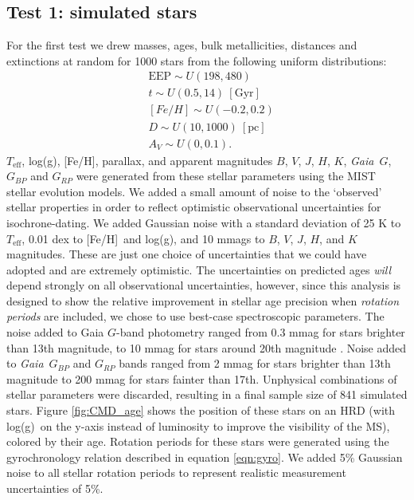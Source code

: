 \documentclass[useAMS, usenatbib, preprint, 12pt]{aastex}
\newcommand{\gaia}{{\it Gaia}}
\newcommand{\teff}{$T_{\mathrm{eff}}$}
\newcommand{\feh}{[Fe/H]}
\newcommand{\logg}{log(g)}
\begin{document}
\subsection{Test 1: simulated stars}
For the first test we drew masses, ages, bulk metallicities, distances and
extinctions at random for 1000 stars from the following uniform distributions:
\begin{eqnarray}
& \mathrm{EEP} \sim U(198, 480) \\
& t \sim U(0.5, 14)\mathrm{~[Gyr]} \\
& [Fe/H] \sim U(-0.2, 0.2) \\
& D \sim U(10, 1000)~\mathrm{[pc]} \\
& A_V \sim U(0, 0.1).
\end{eqnarray}
\teff, \logg, [Fe/H], parallax, and apparent magnitudes $B$, $V$, $J$, $H$, $K$,
\gaia\ $G$, $G_{BP}$ and $G_{RP}$ were generated from these
stellar parameters using the MIST stellar evolution models.
We added a small amount of noise to the `observed' stellar properties in order
to reflect optimistic observational uncertainties for isochrone-dating.
We added Gaussian noise with a standard deviation of 25 K to \teff, 0.01 dex
to \feh\ and \logg, and 10 mmags to $B$, $V$, $J$, $H$, and $K$ magnitudes.
These are just one choice of uncertainties that we could have adopted and are
extremely optimistic.
The uncertainties on predicted ages {\it will} depend strongly on all
observational uncertainties, however, since this analysis is designed to show
the relative improvement in stellar age precision when {\it rotation periods}
are included, we chose to use best-case spectroscopic parameters.
The noise added to Gaia $G$-band photometry ranged from
0.3 mmag for stars brighter than 13th magnitude, to 10 mmag for stars
around 20th magnitude \citep{evans2017, brown2018}.
Noise added to \gaia\ $G_{BP}$ and $G_{RP}$ bands ranged from 2 mmag for stars
brighter than 13th magnitude to 200 mmag for stars fainter than 17th.
Unphysical combinations of stellar parameters were discarded, resulting in a
final sample size of 841 simulated stars.
Figure \ref{fig:CMD_age} shows the position of these stars on an HRD
(with \logg\ on the y-axis instead of luminosity to improve the visibility of
the MS), colored by their age.
Rotation periods for these stars were generated using the gyrochronology
relation described in equation \ref{eqn:gyro}.
We added 5\% Gaussian noise to all stellar rotation periods to represent
realistic measurement uncertainties of 5\%.
\end{document}

